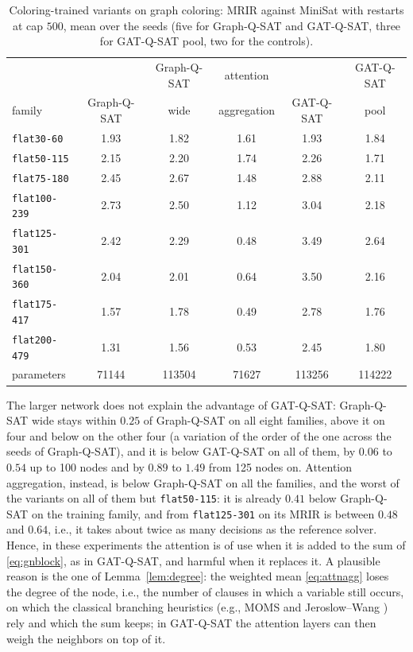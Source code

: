\documentclass[11pt,a4paper]{article}
\newcommand{\code}[1]{\texttt{\def\_{\textunderscore\allowbreak}#1}}
\begin{document}
\begin{table}[ht]\centering\small
\begin{tabular}{lccccc}
\toprule
 & & Graph-Q-SAT & attention & & GAT-Q-SAT \\
family & Graph-Q-SAT & wide & aggregation & GAT-Q-SAT & pool \\
\midrule
\code{flat30-60} & 1.93 & 1.82 & 1.61 & 1.93 & 1.84 \\
\code{flat50-115} & 2.15 & 2.20 & 1.74 & 2.26 & 1.71 \\
\code{flat75-180} & 2.45 & 2.67 & 1.48 & 2.88 & 2.11 \\
\code{flat100-239} & 2.73 & 2.50 & 1.12 & 3.04 & 2.18 \\
\code{flat125-301} & 2.42 & 2.29 & 0.48 & 3.49 & 2.64 \\
\code{flat150-360} & 2.04 & 2.01 & 0.64 & 3.50 & 2.16 \\
\code{flat175-417} & 1.57 & 1.78 & 0.49 & 2.78 & 1.76 \\
\code{flat200-479} & 1.31 & 1.56 & 0.53 & 2.45 & 1.80 \\
\midrule
parameters & 71144 & 113504 & 71627 & 113256 & 114222 \\
\bottomrule
\end{tabular}
\caption{Coloring-trained variants on graph coloring: MRIR against MiniSat with
restarts at cap $500$, mean over the seeds (five for Graph-Q-SAT and GAT-Q-SAT,
three for GAT-Q-SAT pool, two for the controls).}
\label{tab:controls}
\end{table}

\noindent
The larger network does not explain the advantage of GAT-Q-SAT: Graph-Q-SAT
wide stays within $0.25$ of Graph-Q-SAT on all eight families, above it on four and below on the other four (a variation of the order of the one
across the seeds of Graph-Q-SAT), and it is below GAT-Q-SAT on all of them, by $0.06$ to $0.54$ up to 100 nodes and by $0.89$ to $1.49$
from 125 nodes on. Attention aggregation, instead, is below Graph-Q-SAT on all the
families, and the worst of the variants on all of them but \code{flat50-115}:
it is already $0.41$ below Graph-Q-SAT on the training family, and from
\code{flat125-301} on its MRIR is between $0.48$ and $0.64$, i.e., it takes about twice as many decisions as the reference
solver. Hence, in these experiments the attention is of use when it is added
to the sum of \eqref{eq:gnblock}, as in GAT-Q-SAT, and harmful when it replaces
it. A
plausible reason is the one of Lemma~\ref{lem:degree}: the weighted mean
\eqref{eq:attnagg} loses the degree of the node, i.e., the number of clauses in
which a variable still occurs, on which the classical branching heuristics
(e.g., MOMS and Jeroslow--Wang \cite{MarquesSilva1999}) rely and which the sum
keeps; in GAT-Q-SAT the attention layers can then weigh the neighbors on top of
it.
\end{document}
